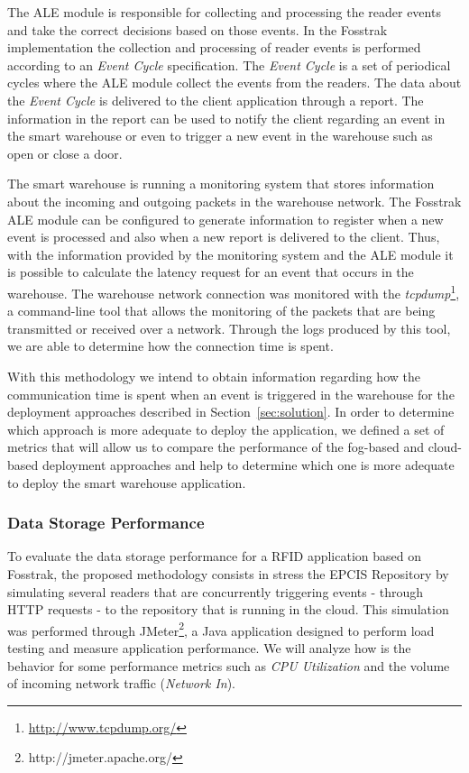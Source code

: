 The \gls{ALE} module is responsible for collecting and processing the reader events and take the
correct decisions based on those events. In the Fosstrak implementation the collection and processing
of reader events is performed according to an \textit{Event Cycle} specification. The \textit{Event Cycle}
is a set of periodical cycles where the \gls{ALE} module collect the events from the readers. The data
about the \textit{Event Cycle} is delivered to the client application through a report. The information
in the report can be used to notify the client regarding an event in the smart warehouse or even to
trigger a new event in the warehouse such as open or close a door.

The smart warehouse is running a monitoring system that stores information about the incoming and outgoing
packets in the warehouse network. The Fosstrak \gls{ALE} module can be configured to generate
information to register when a new event is processed and also when a new report is delivered to the
client. Thus, with the information provided by the monitoring system and the \gls{ALE} module it is
possible to calculate the latency request for an event that occurs in the warehouse. The warehouse network
connection was monitored with the \textit{tcpdump}\footnote{\url{http://www.tcpdump.org/}}, a command-line
tool that allows the monitoring of the packets that are being transmitted or received over a network.
Through the logs produced by this tool, we are able to determine how the connection time is spent.

With this methodology we intend to obtain information regarding how the communication time is spent
when an event is triggered in the warehouse for the deployment approaches described in Section~\ref{sec:solution}.
In order to determine which approach is more adequate to deploy the application, we defined a set of
metrics that will allow us to compare the performance of the fog-based and cloud-based deployment
approaches and help to determine which one is more adequate to deploy the smart warehouse
application.

\subsubsection{Data Storage Performance}
To evaluate the data storage performance for a RFID application based on Fosstrak, the proposed
methodology consists in stress the EPCIS Repository by simulating several readers that are concurrently
triggering events - through HTTP requests - to the repository that is running in the cloud. This
simulation was performed through JMeter\footnote{http://jmeter.apache.org/}, a Java application
designed to perform load testing and measure application performance. We will analyze how is the
behavior for some performance metrics such as \textit{CPU Utilization} and the volume of incoming
network traffic (\textit{Network In}).

